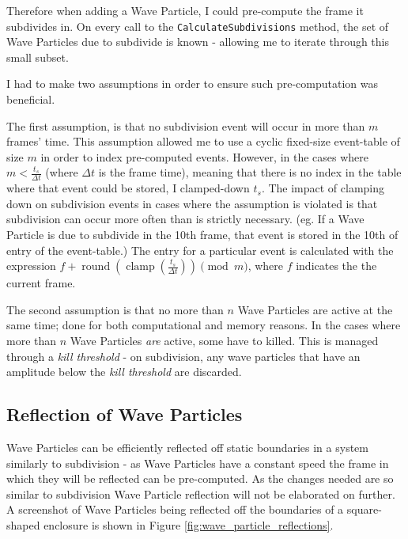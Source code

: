 \documentclass[12pt,a4paper,twoside]{report}
\begin{document}
Therefore when adding a Wave Particle, I could pre-compute the frame it
subdivides in. On every call to the \texttt{CalculateSubdivisions} method, the
set of Wave Particles due to subdivide is known - allowing me to iterate
through this small subset.

I had to make two assumptions in order to ensure such pre-computation was
beneficial.

The first assumption, is that no subdivision event will occur in more than $m$
frames' time. This assumption allowed me to use a cyclic fixed-size event-table
of size $m$ in order to index pre-computed events. However, in the cases where
$m < \frac{t_s}{\Delta{t}}$ (where $\Delta{t}$ is the frame time), meaning that
there is no index in the table where that event could be stored, I clamped-down
$t_s$. The impact of clamping down on subdivision events in cases where the
assumption is violated is that subdivision can occur more often than is
strictly necessary. (eg. If a Wave Particle is due to subdivide in the 10th
frame, that event is stored in the 10th of entry of the event-table.) The entry
for a particular event is calculated with the expression
$f+\operatorname{round}{(\operatorname{clamp}(\frac{t_s}{\Delta{t}}))}\pmod{m}$,
where $f$ indicates the the current frame.

The second assumption is that no more than $n$ Wave Particles are active at the
same time; done for both computational and memory reasons. In the cases where
more than $n$ Wave Particles \emph{are} active, some have to killed. This is
managed through a \textit{kill threshold} - on subdivision, any wave particles
that have an amplitude below the \textit{kill threshold} are discarded.

\subsection{Reflection of Wave Particles}

Wave Particles can be efficiently reflected off static boundaries in a system
similarly to subdivision - as Wave Particles have a constant speed the frame in
which they will be reflected can be pre-computed. As the changes needed are so
similar to subdivision Wave Particle reflection will not be elaborated on
further. A screenshot of Wave Particles being reflected off the boundaries of a
square-shaped enclosure is shown in Figure \ref{fig:wave_particle_reflections}.
\end{document}
